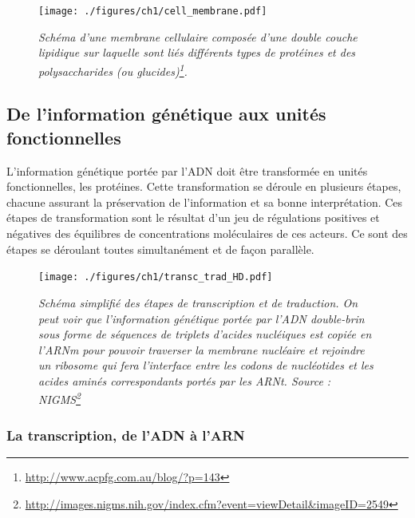 \begin{figure}[htb]
  \centering
  {\texttt{[image: ./figures/ch1/cell\_membrane.pdf]}}
    \caption[Schéma d'une membrane cellulaire.]{\it Schéma d'une membrane cellulaire composée d'une double couche lipidique sur laquelle sont liés différents types de protéines et des polysaccharides (ou glucides)\footnote{\url{http://www.acpfg.com.au/blog/?p=143}}.}
    \label{Fig:cell_membrane}
  \hspace{0.2cm}
\end{figure}


\subsection{De l'information génétique aux unités fonctionnelles} \label{trans_trad}

L'information génétique portée par l'ADN doit être transformée en unités fonctionnelles, les protéines. Cette transformation  se déroule en plusieurs étapes, chacune assurant la préservation de l'information et sa bonne interprétation. Ces étapes de transformation sont le résultat d'un jeu de régulations positives et négatives des équilibres de concentrations moléculaires de ces acteurs. Ce sont des étapes se déroulant toutes simultanément et de façon parallèle.

\begin{figure}[htb]
  \centering
  {\texttt{[image: ./figures/ch1/transc\_trad\_HD.pdf]}}
    \caption[Schéma simplifié des étapes de transcription et de traduction.]{\it Schéma simplifié des étapes de transcription et de traduction. On peut voir que l'information génétique portée par l'ADN double-brin sous forme de séquences de triplets d'acides nucléiques est copiée en l'ARNm pour pouvoir traverser la membrane nucléaire et rejoindre un ribosome qui fera l'interface entre les codons de nucléotides et les acides aminés correspondants portés par les ARNt. Source : NIGMS\footnote{\url{http://images.nigms.nih.gov/index.cfm?event=viewDetail&imageID=2549}}}
    \label{Fig:transc_trad_HD}
\end{figure}

\subsubsection{La transcription, de l'ADN à l'ARN}


